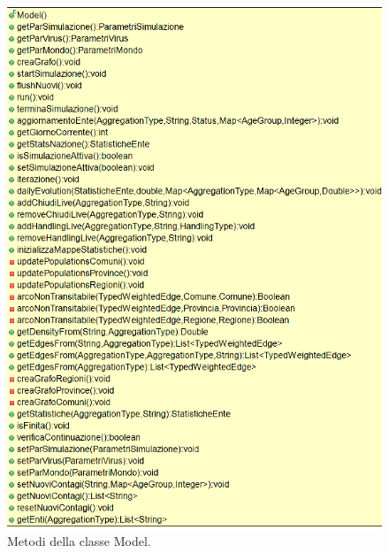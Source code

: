 \documentclass[a4paper, 12pt]{article}
\begin{document}
		\begin{figure}[H]
			\centering
			\includegraphics[width=\linewidth]{IMG/model_2.png}
			\caption[UML metodi modello]{Metodi della classe Model.}
			\label{fig:UMLmodel2}
		\end{figure}
	
\end{document}
